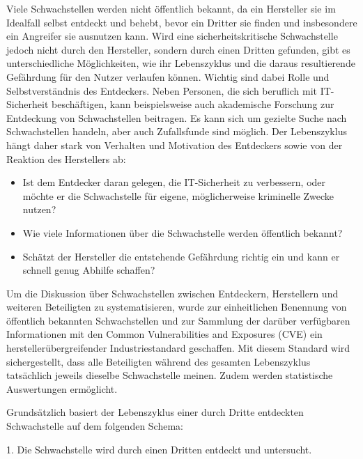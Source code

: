 \documentclass[12pt,oneside,a4paper,parskip]{scrbook}
\begin{document}
  Viele Schwachstellen werden nicht öffentlich bekannt, da ein Hersteller sie im Idealfall
  selbst entdeckt und behebt, bevor ein Dritter sie finden und insbesondere ein Angreifer
  sie ausnutzen kann.
  Wird eine sicherheitskritische Schwachstelle jedoch nicht durch den Hersteller, sondern
  durch einen Dritten gefunden, gibt es unterschiedliche Möglichkeiten, wie ihr Lebenszyklus und die daraus resultierende Gefährdung für den Nutzer verlaufen können.
  Wichtig sind dabei Rolle und Selbstverständnis des Entdeckers. Neben Personen, die
  sich beruflich mit IT-Sicherheit beschäftigen, kann beispielsweise auch akademische
  Forschung zur Entdeckung von Schwachstellen beitragen. Es kann sich um gezielte Suche nach Schwachstellen handeln, aber auch Zufallsfunde sind möglich.
  Der Lebenszyklus hängt daher stark von Verhalten und Motivation des Entdeckers sowie von der Reaktion des Herstellers ab:
  \begin{itemize}
    \item Ist dem Entdecker daran gelegen, die IT-Sicherheit zu verbessern, oder möchte er die
    Schwachstelle für eigene, möglicherweise kriminelle Zwecke nutzen?
    \item Wie viele Informationen über die Schwachstelle werden öffentlich bekannt?
    \item Schätzt der Hersteller die entstehende Gefährdung richtig ein und kann er schnell genug Abhilfe
  schaffen?
  \end{itemize}
  Um die Diskussion über Schwachstellen zwischen Entdeckern, Herstellern und weiteren
  Beteiligten zu systematisieren, wurde zur einheitlichen Benennung von öffentlich bekannten Schwachstellen und zur Sammlung der darüber verfügbaren Informationen
  mit den Common Vulnerabilities and Exposures (CVE) ein herstellerübergreifender Industriestandard geschaffen. Mit diesem Standard wird sichergestellt, dass alle Beteiligten während des gesamten Lebenszyklus tatsächlich jeweils dieselbe Schwachstelle meinen. Zudem werden statistische Auswertungen ermöglicht.

  Grundsätzlich basiert der Lebenszyklus einer durch Dritte entdeckten Schwachstelle auf dem
  folgenden Schema:

  1. Die Schwachstelle wird durch einen Dritten entdeckt und untersucht.
\end{document}
